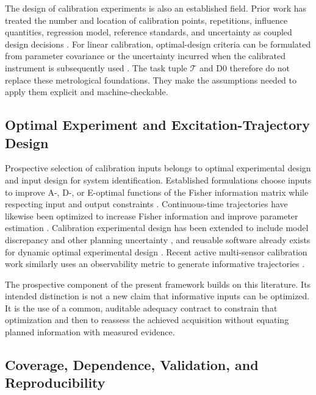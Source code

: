 \documentclass[11pt,a4paper]{article}
\begin{document}
The design of calibration experiments is also an established field. Prior work
has treated the number and location of calibration points, repetitions,
influence quantities, regression model, reference standards, and uncertainty
as coupled design decisions \cite{betta2001}. For linear calibration,
optimal-design criteria can be formulated from parameter covariance or the
uncertainty incurred when the calibrated instrument is subsequently used
\cite{forbes2013}. The task tuple $\mathcal{T}$ and D0 therefore do not replace
these metrological foundations. They make the assumptions needed to apply them
explicit and machine-checkable.

\subsection{Optimal Experiment and Excitation-Trajectory Design}

Prospective selection of calibration inputs belongs to optimal experimental
design and input design for system identification. Established formulations
choose inputs to improve A-, D-, or E-optimal functions of the Fisher
information matrix while respecting input and output constraints
\cite{manchester2010}. Continuous-time trajectories have likewise been
optimized to increase Fisher information and improve parameter estimation
\cite{wilson2014}. Calibration experimental design has been extended to include
model discrepancy and other planning uncertainty \cite{hu2017}, and reusable
software already exists for dynamic optimal experimental design
\cite{martensen2024}. Recent active multi-sensor calibration work similarly
uses an observability metric to generate informative trajectories
\cite{wang2025active}.

The prospective component of the present framework builds on this literature.
Its intended distinction is not a new claim that informative inputs can be
optimized. It is the use of a common, auditable adequacy contract to constrain
that optimization and then to reassess the achieved acquisition without
equating planned information with measured evidence.

\subsection{Coverage, Dependence, Validation, and Reproducibility}
\end{document}
